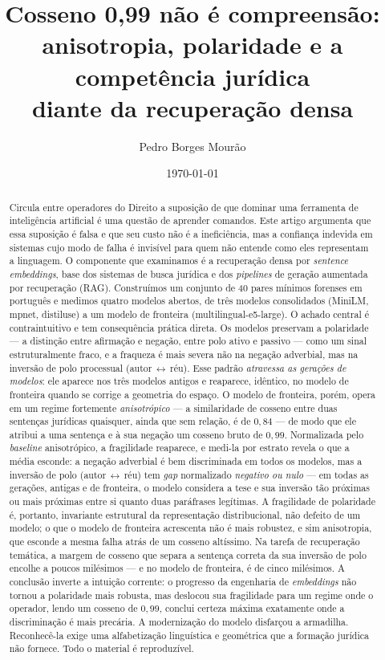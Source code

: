 \documentclass[11pt]{article}
\title{\textbf{Cosseno 0,99 não é compreensão:\\
\large anisotropia, polaridade e a competência jurídica\\
diante da recuperação densa}}
\author[ ]{Pedro Borges Mourão}
\affil[ ]{\small Promotor de Justiça, Mestre em Direito, Especialista em Segurança da Informação\\
e pesquisador na interseção entre Direito, inteligência artificial e forense digital.}
\date{\today}
\begin{document}
\maketitle

\begin{abstract}
\noindent
Circula entre operadores do Direito a suposição de que dominar uma ferramenta de
inteligência artificial é uma questão de aprender comandos. Este artigo argumenta
que essa suposição é falsa e que seu custo não é a ineficiência, mas a confiança
indevida em sistemas cujo modo de falha é invisível para quem não entende como
eles representam a linguagem. O componente que examinamos é a recuperação densa
por \textit{sentence embeddings}, base dos sistemas de busca jurídica e dos
\textit{pipelines} de geração aumentada por recuperação (RAG). Construímos um
conjunto de 40 pares mínimos forenses em português e medimos quatro modelos
abertos, de três modelos consolidados (MiniLM, mpnet, distiluse) a um modelo de
fronteira (multilingual-e5-large). O achado central é contraintuitivo e tem
consequência prática direta. Os modelos preservam a polaridade --- a distinção
entre afirmação e negação, entre polo ativo e passivo --- como um sinal
estruturalmente fraco, e a fraqueza é mais severa não na negação adverbial, mas
na inversão de polo processual (autor\,$\leftrightarrow$\,réu). Esse padrão
\emph{atravessa as gerações de modelos}: ele aparece nos três modelos antigos e
reaparece, idêntico, no modelo de fronteira quando se corrige a geometria do
espaço. O modelo de fronteira, porém, opera em um regime fortemente
\emph{anisotrópico} --- a similaridade de cosseno entre duas sentenças jurídicas
quaisquer, ainda que sem relação, é de $0{,}84$ --- de modo que ele atribui a uma
sentença e à sua negação um cosseno bruto de $0{,}99$. Normalizada pelo
\textit{baseline} anisotrópico, a fragilidade reaparece, e medi-la por estrato
revela o que a média esconde: a negação adverbial é bem discriminada em todos os
modelos, mas a inversão de polo (autor\,$\leftrightarrow$\,réu) tem
\textit{gap} normalizado \emph{negativo ou nulo} --- em todas as gerações, antigas
e de fronteira, o modelo considera a tese e sua inversão tão próximas ou mais
próximas entre si quanto duas paráfrases legítimas. A fragilidade de polaridade é,
portanto, invariante estrutural da representação distribucional, não defeito de um
modelo; o que o modelo de fronteira acrescenta não é mais robustez, e sim
anisotropia, que esconde a mesma falha atrás de um cosseno altíssimo. Na tarefa de
recuperação temática, a margem de cosseno que separa a sentença correta da sua
inversão de polo encolhe a poucos milésimos --- e no modelo de fronteira,
é de cinco milésimos. A conclusão inverte a intuição corrente: o progresso da
engenharia de \textit{embeddings} não tornou a polaridade mais robusta, mas
deslocou sua fragilidade para um regime onde o operador, lendo um cosseno de
$0{,}99$, conclui certeza máxima exatamente onde a discriminação é mais precária.
A modernização do modelo disfarçou a armadilha. Reconhecê-la exige uma
alfabetização linguística e geométrica que a formação jurídica não fornece. Todo
o material é reproduzível.


\end{abstract}
\end{document}
